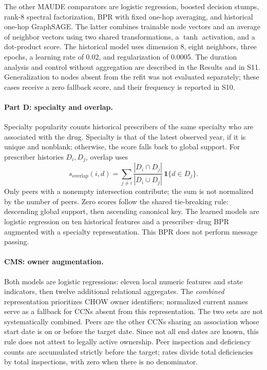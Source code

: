 The other MAUDE comparators are logistic regression, boosted decision stumps, rank-8 spectral factorization, BPR with fixed one-hop averaging, and historical one-hop GraphSAGE\cite{hamilton2017,rendle2009,hgbcode}. The latter combines trainable node vectors and an average of neighbor vectors using two shared transformations, a $\tanh$ activation, and a dot-product score. The historical model uses dimension 8, eight neighbors, three epochs, a learning rate of 0.02, and regularization of 0.0005. The duration analysis and control without aggregation are described in the Results and in S11. Generalization to nodes absent from the refit was not evaluated separately; these cases receive a zero fallback score, and their frequency is reported in S10.

\paragraph{Part D: specialty and overlap.} Specialty popularity counts historical prescribers of the same specialty who are associated with the drug. Specialty is that of the latest observed year, if it is unique and nonblank; otherwise, the score falls back to global support. For prescriber histories $D_i,D_j$, overlap uses
\begin{equation}
 s_{\mathrm{overlap}}(i,d)=\sum_{j\ne i}\frac{|D_i\cap D_j|}{|D_i\cup D_j|}\,\mathbf{1}\{d\in D_j\}.
\end{equation}
Only peers with a nonempty intersection contribute; the sum is not normalized by the number of peers. Zero scores follow the shared tie-breaking rule: descending global support, then ascending canonical key. The learned models are logistic regression on ten historical features and a prescriber--drug BPR augmented with a specialty representation. This BPR does not perform message passing\cite{hgbcode,hgbpartd}.

\paragraph{CMS: owner augmentation.} Both models are logistic regressions: eleven local numeric features and state indicators, then twelve additional relational aggregates. The \emph{combined} representation prioritizes CHOW owner identifiers; normalized current names serve as a fallback for CCNs absent from this representation. The two sets are not systematically combined. Peers are the other CCNs sharing an association whose start date is on or before the target date. Since not all end dates are known, this rule does not attest to legally active ownership. Peer inspection and deficiency counts are accumulated strictly before the target; rates divide total deficiencies by total inspections, with zero when there is no denominator\cite{hgbcode}.

